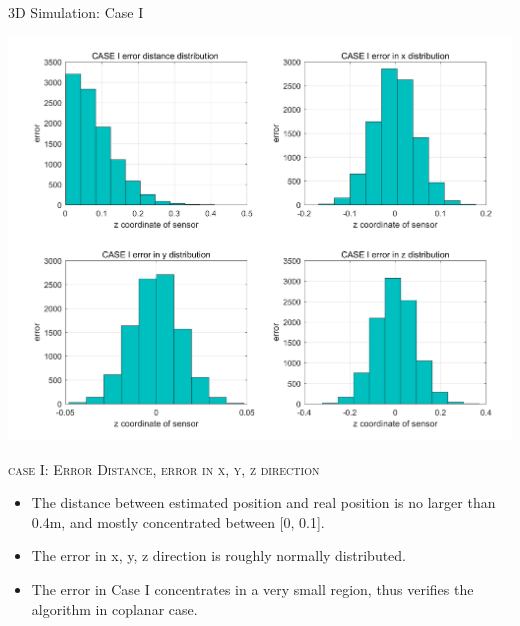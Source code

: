 \documentclass[10pt]{beamer}
\begin{document}
\begin{frame}{3D Simulation: Case I}
  \begin{center}
  \includegraphics[scale = 0.15]{img/case1error.png}
  \end{center}
  \begin{center} \textsc{case I: Error Distance, error in x, y, z direction} \end{center}
  \begin{itemize}
    \item \small The distance between estimated position and real position is no larger than 0.4m, and mostly concentrated between [0, 0.1].
    \item \small The error in x, y, z direction is roughly normally distributed.
    \item \small The error in Case I concentrates in a very small region, thus verifies the algorithm in coplanar case. 
  \end{itemize}
\end{frame}
\end{document}
